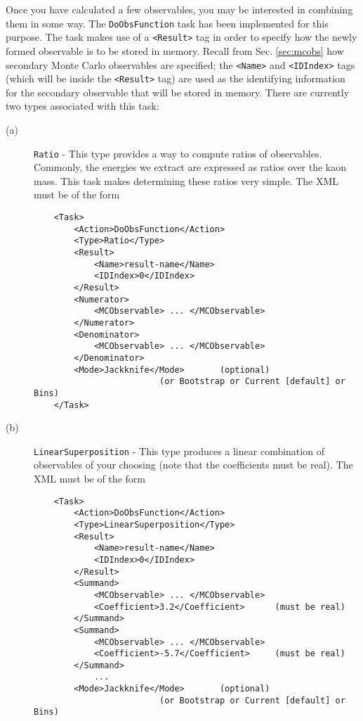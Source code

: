 \documentclass[12pt]{article}
\newcommand{\vb}{\texttt}
\begin{document}
Once you have calculated a few observables, you may be interested in combining them in some way.
The \vb{DoObsFunction} task has been implemented for this purpose.
The task makes use of a \vb{<Result>} tag in order to specify how
the newly formed observable is to be stored in memory.
Recall from Sec. \ref{sec:mcobs}
how secondary Monte Carlo observables are specified; the \vb{<Name>}
and \vb{<IDIndex>} tags (which will be inside the \vb{<Result>} tag)
are used as the identifying information
for the secondary observable that will be stored in memory.
There are currently two types
associated with this task:
\begin{description}
\item[(a)] \vb{Ratio} - This type provides a way to compute ratios of observables. Commonly,
the energies we extract are expressed as ratios over the kaon mass. This task makes
determining these ratios very simple. The XML must be of the form
\begin{verbatim}
    <Task>
        <Action>DoObsFunction</Action>
        <Type>Ratio</Type>
        <Result>
            <Name>result-name</Name>
            <IDIndex>0</IDIndex>
        </Result>
        <Numerator>
            <MCObservable> ... </MCObservable>
        </Numerator>
        <Denominator>
            <MCObservable> ... </MCObservable>
        </Denominator>
        <Mode>Jackknife</Mode>       (optional)
                         (or Bootstrap or Current [default] or Bins)
    </Task>
\end{verbatim}
\item[(b)] \vb{LinearSuperposition} - This type produces a linear combination
of observables of your choosing (note that the coefficients must be real).
The XML must be of the form
\begin{verbatim}
    <Task>
        <Action>DoObsFunction</Action>
        <Type>LinearSuperposition</Type>
        <Result>
            <Name>result-name</Name>
            <IDIndex>0</IDIndex>
        </Result>
        <Summand>
            <MCObservable> ... </MCObservable>
            <Coefficient>3.2</Coefficient>      (must be real)
        </Summand>
        <Summand>
            <MCObservable> ... </MCObservable>
            <Coefficient>-5.7</Coefficient>     (must be real)
        </Summand>
            ...
        <Mode>Jackknife</Mode>       (optional)
                         (or Bootstrap or Current [default] or Bins)
\end{verbatim}
\end{description}
\end{document}
